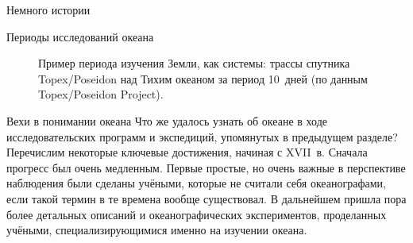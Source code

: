 \begin{chapter}{Немного истории}
\begin{section}{Периоды исследований океана}
\begin{figure}[b!]
\caption{Пример периода изучения Земли, как системы:
трассы спутника Topex/Poseidon над Тихим океаном за период 10~дней
(по данным Topex/Poseidon Project).}
\label{fig:Fig2-6}
\end{figure}
%
% 
\end{section}

\begin{section}{Вехи в понимании океана}
Что же удалось узнать об океане в ходе исследовательских программ и
экспедиций, упомянутых в предыдущем разделе? Перечислим некоторые ключевые
достижения, начиная с XVII~в. Сначала прогресс
был очень медленным. Первые простые, но очень важные в перспективе
наблюдения были сделаны учёными, которые не считали себя океанографами, 
если такой термин в те времена вообще существовал. 
В дальнейшем пришла пора более детальных описаний и океанографических 
экспериментов, проделанных учёными, специализирующимися
именно на изучении океана. 
%


\end{section}
\end{chapter}
